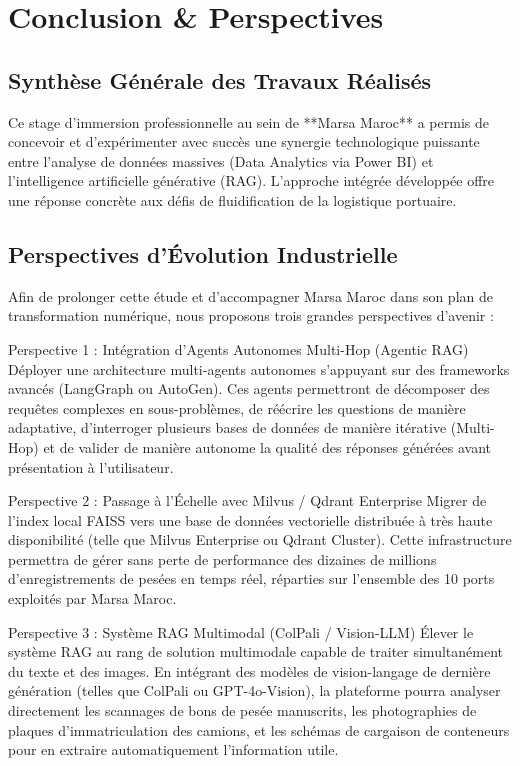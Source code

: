 \documentclass[12pt,a4paper,oneside]{report}
\begin{document}
\section{Conclusion \& Perspectives}

\subsection{Synthèse Générale des Travaux Réalisés}
Ce stage d'immersion professionnelle au sein de **Marsa Maroc** a permis de concevoir et d'expérimenter avec succès une synergie technologique puissante entre l'analyse de données massives (Data Analytics via Power BI) et l'intelligence artificielle générative (RAG). L'approche intégrée développée offre une réponse concrète aux défis de fluidification de la logistique portuaire.

\subsection{Perspectives d'Évolution Industrielle}
Afin de prolonger cette étude et d'accompagner Marsa Maroc dans son plan de transformation numérique, nous proposons trois grandes perspectives d'avenir :

\begin{infobox}{Perspective 1 : Intégration d'Agents Autonomes Multi-Hop (Agentic RAG)}
Déployer une architecture multi-agents autonomes s'appuyant sur des frameworks avancés (LangGraph ou AutoGen). Ces agents permettront de décomposer des requêtes complexes en sous-problèmes, de réécrire les questions de manière adaptative, d'interroger plusieurs bases de données de manière itérative (Multi-Hop) et de valider de manière autonome la qualité des réponses générées avant présentation à l'utilisateur.
\end{infobox}

\begin{infobox}{Perspective 2 : Passage à l'Échelle avec Milvus / Qdrant Enterprise}
Migrer de l'index local FAISS vers une base de données vectorielle distribuée à très haute disponibilité (telle que Milvus Enterprise ou Qdrant Cluster). Cette infrastructure permettra de gérer sans perte de performance des dizaines de millions d'enregistrements de pesées en temps réel, réparties sur l'ensemble des 10 ports exploités par Marsa Maroc.
\end{infobox}

\begin{infobox}{Perspective 3 : Système RAG Multimodal (ColPali / Vision-LLM)}
Élever le système RAG au rang de solution multimodale capable de traiter simultanément du texte et des images. En intégrant des modèles de vision-langage de dernière génération (telles que ColPali ou GPT-4o-Vision), la plateforme pourra analyser directement les scannages de bons de pesée manuscrits, les photographies de plaques d'immatriculation des camions, et les schémas de cargaison de conteneurs pour en extraire automatiquement l'information utile.
\end{infobox}
\end{document}
